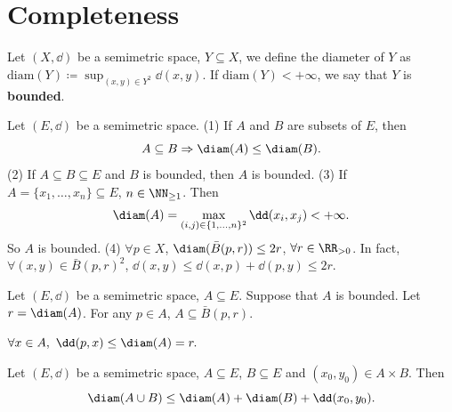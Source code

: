 \section{Completeness}
\begin{definitionenv}
    Let $(X,\dd)$ be a semimetric space, $Y\subseteq X$, we define the diameter of $Y$ as $ \mathrm{diam}(Y)\coloneq\sup_{(x,y)\in Y^2}\dd(x,y)$. If $\mathrm{diam}(Y)<+\infty$, we say that $Y$ is \textbf{bounded}.
\end{definitionenv}
\begin{remark}
    Let $(E,\dd)$ be a semimetric space. 
    \newline
    (1) If $A$ and $B$ are subsets of $E$, then 
    $$A\subseteq B\Rightarrow \diam(A)\le \diam(B).$$
    (2) If $A\subseteq B\subseteq E$ and $B$ is bounded, then $A$ is bounded.
    \newline
    (3) If $A=\{x_1,\dots,x_n\}\subseteq E$, $n\in\NN_{\ge1}$. Then 
    $$\diam(A)=\max_{(i,j)\in \{1,\dots,n\}^2}\dd(x_i,x_j)<+\infty.$$
    So $A$ is bounded.
    \newline
    (4) $\forall p\in X$, $\diam(\bar{B}(p,r))\le 2r$, $\forall r\in \RR_{>0}$. In fact, $\forall (x,y)\in \bar{B}(p,r)^2$, $\dd(x,y)\le\dd(x,p)+\dd(p,y)\le 2r$.
\end{remark}
\begin{propositionenv}
    Let $(E,\dd)$ be a semimetric space, $A\subseteq E$. Suppose that $A$ is bounded. Let $r=\diam(A)$. For any $p\in A$, $A\subseteq\bar{B}(p,r)$.
\end{propositionenv}
\begin{proofenv}
    $\forall x\in A,\ \dd(p,x)\le \diam(A)=r.$
\end{proofenv}
\begin{propositionenv}\label{8.7.4}
    Let $(E,\dd)$ be a semimetric space, $A\subseteq E$, $B\subseteq E$ and $(x_0,y_0)\in A\times B$. Then 
    $$\diam(A\cup B)\le \diam(A)+\diam(B)+\dd(x_0,y_0).$$
\end{propositionenv}

